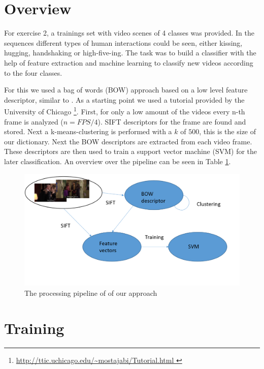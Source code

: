 \documentclass[]{scrartcl}
\begin{document}
\maketitle

\section{Overview}
For exercise 2, a trainings set with video scenes of 4 classes was provided. 
In the sequences different types of human interactions could be seen, either kissing, hugging, handshaking or high-five-ing. 
The task was to build a classifier with the help of feature extraction and machine learning to classify new videos according to the four classes.

For this we used a bag of words (BOW) \cite{csurka2004visual} approach based on a low level feature descriptor, similar to \cite{tamrakar2012evaluation}. As a starting point we used a tutorial provided by the University of Chicago \footnote{\url{http://ttic.uchicago.edu/~mostajabi/Tutorial.html }}.
First, for only a low amount of the videos every n-th frame is analyzed ($n = FPS/4$). 
SIFT \cite{lowe2004distinctive} descriptors for the frame are found and stored. 
Next a k-means-clustering is performed with a $k$ of $500$, this is the size of our dictionary. 
Next the BOW descriptors are extracted from each video frame. 
These descriptors are then used to train a support vector machine (SVM) for the later classification.
An overview over the pipeline can be seen in Table \ref{fig:grafik}.
\begin{figure}[h]
	\centering
	\includegraphics[width = \textwidth]{grafik.png}
	\caption{The processing pipeline of of our approach}
	\label{fig:grafik}
\end{figure}
\section{Training}	
\end{document}
